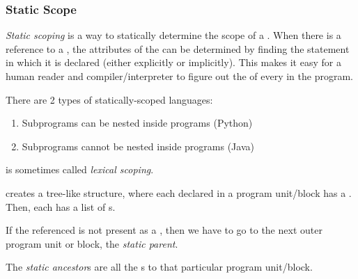 \subsubsection{Static Scope}\label{subsubsec:Variable_Static_Scope}
\begin{definition}\label{def:Variable_Static_Scoping}
  \emph{Static scoping} is a way to statically determine the scope of a .
  When there is a reference to a , the attributes of the  can be determined by finding the statement in which it is declared (either explicitly or implicitly).
  This makes it easy for a human reader and compiler/interpreter to figure out the  of every  in the program.

  There are 2 types of statically-scoped languages:
  \begin{enumerate}[noitemsep]
  \item Subprograms can be nested inside programs (Python)
  \item Subprograms cannot be nested inside programs (Java)
  \end{enumerate}

  \begin{remark}\label{rmk:Variable_Lexical_Scoping}
     is sometimes called \emph{lexical scoping}.
  \end{remark}
\end{definition}

 creates a tree-like structure, where each  declared in a program unit/block has a .
Then, each  has a list of s.

\begin{definition}\label{def:Variable_Static_Parent}
  If the  referenced is not present as a , then we have to go to the next outer program unit or block, the \emph{static parent}.
\end{definition}

\begin{definition}\label{def:Variable_Static_Ancestor}
  The \emph{static ancestor}s are all the s to that particular program unit/block.
\end{definition}

